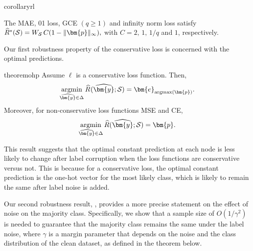 \documentclass[letterpaper]{article} %
\newcommand{\bp}{{\bm{p}}}
\newcommand{\by}{{\bm{y}}}
\newcommand{\be}{{\bm{e}}}
\newcommand{\cP}{{\cal{P}}}
\newcommand{\cS}{{\cal{S}}}
\newcommand{\simplex}{\Delta}
\newcommand{\argmax}{\mathrm{argmax}}
\newcommand{\argmin}{\mathrm{argmin}}
\newtheorem{corollary}{Corollary}[theorem]
\begin{document}
\begin{restatable}[]{corollary}{rl}
\label{cor:robust_losses} 

    The MAE, 01 loss, GCE $(q\geq 1)$ and infinity norm loss satisfy
    $
        \widehat{R}^*(\cS) = W_{\cS}\, C(1-\|\bp\|_\infty),
    $
    with $C=2,\,1,\,1/q$ and $1$, respectively. 
\end{restatable}

Our first robustness property of the conservative loss is concerned with the
optimal predictions.


\begin{restatable}[]{theorem}{ohp}
\label{cor:one-hot-predictions}
    Assume $\ell$ is a conservative loss function. Then,
    \[\underset{\widehat{\by}\in \simplex}{\argmin}\,\widehat{R}_{}(\widehat{\by};\cS) = \be_{\argmax(\bp)}.\]
    Moreover, for non-conservative loss functions MSE and CE,
    \[
        \underset{\widehat{\by} \in \simplex}{\argmin}\,\widehat{R}(\widehat{\by};\cS) = \bp.
    \]
\end{restatable}
This result suggests that the optimal constant prediction at each node is less
likely to change after label corruption when the loss functions are conservative
versus not.
This is because for a conservative loss, the optimal constant prediction is the
one-hot vector for the most likely class, which is likely to remain the same
after label noise is added.

Our second robustness result, , provides a more precise
statement on the effect of noise on the majority class.
Specifically, we show that a sample size of $O(1/\gamma^{2})$ is needed to
guarantee that the majority class remains the same under the label noise, where
$\gamma$ is a margin parameter that depends on the noise and the class
distribution of the clean dataset, as defined in the theorem below.
\end{document}
